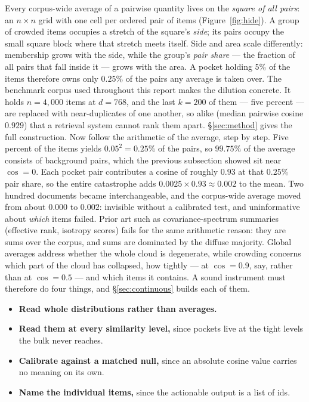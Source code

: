 \documentclass[11pt,letterpaper]{article}
\begin{document}
Every corpus-wide average of a pairwise quantity lives on the \emph{square
of all pairs}: an $n \times n$ grid with one cell per ordered pair of
items (Figure~\ref{fig:hide}). A group of crowded items occupies a stretch
of the square's \emph{side}; its pairs occupy the small square block where
that stretch meets itself. Side and area scale differently: membership
grows with the side, while the group's \emph{pair share} --- the fraction
of all pairs that fall inside it --- grows with the area. A pocket holding
$5\%$ of the items therefore owns only $0.25\%$ of the pairs any average
is taken over. The benchmark corpus used throughout this report makes the
dilution concrete. It holds $n = 4{,}000$ items at $d = 768$, and the last
$k = 200$ of them --- five percent --- are replaced with near-duplicates
of one another, so alike (median pairwise cosine $0.929$) that a retrieval
system cannot rank them apart. \S\ref{sec:method} gives the full
construction. Now follow the arithmetic of the average, step by step. Five
percent of the items yields $0.05^2 = 0.25\%$ of the pairs, so $99.75\%$
of the average consists of background pairs, which the previous subsection
showed sit near $\cos = 0$. Each pocket pair contributes a cosine of
roughly $0.93$ at that $0.25\%$ pair share, so the entire catastrophe adds
$0.0025 \times 0.93 \approx 0.002$ to the mean. Two hundred documents
became interchangeable, and the corpus-wide average moved from about
$0.000$ to $0.002$: invisible without a calibrated test, and uninformative about \emph{which} items failed. Prior art such as
covariance-spectrum summaries (effective rank, isotropy scores) fails
for the same arithmetic reason: they are sums
over the corpus, and sums are dominated by the diffuse majority. Global
averages address whether the whole cloud is degenerate, while crowding
concerns which part of the cloud has collapsed, how tightly --- at $\cos =
0.9$, say, rather than at $\cos = 0.5$ --- and which items it contains. A
sound instrument must therefore do four things, and \S\ref{sec:continuous}
builds each of them.
\begin{itemize}
\item \textbf{Read whole distributions rather than averages.}
\item \textbf{Read them at every similarity level,} since pockets live
  at the tight levels the bulk never reaches.
\item \textbf{Calibrate against a matched null,} since an absolute
  cosine value carries no meaning on its own.
\item \textbf{Name the individual items,} since the actionable output is
  a list of ids.
\end{itemize}
\end{document}
